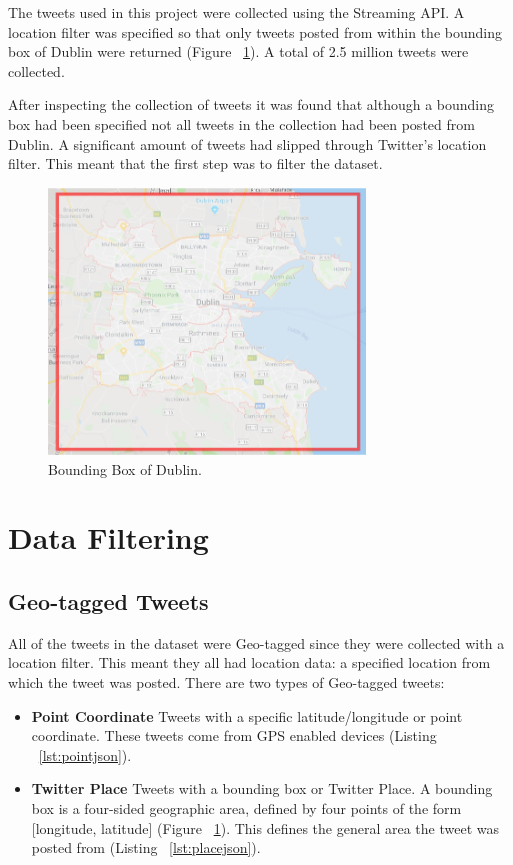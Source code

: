 The tweets used in this project were collected using the Streaming API. A location filter was specified so that only tweets posted from within the bounding box of Dublin were returned (Figure ~\ref{fig:dublinBB}). A total of 2.5 million tweets were collected.

After inspecting the collection of tweets it was found that although a bounding box had been specified not all tweets in the collection had been posted from Dublin. A significant amount of tweets had slipped through Twitter's location filter. This meant that the first step was to filter the dataset.

\begin{figure}[h!]
\centering
\includegraphics[width=0.75\textwidth]{design_and_methodology/dublinBB.png}
\caption{\label{fig:dublinBB} Bounding Box of Dublin.}
\end{figure}

\section{Data Filtering}

\subsection*{Geo-tagged Tweets}

All of the tweets in the dataset were Geo-tagged since they were collected with a location filter. This meant they all had location data: a specified location from which the tweet was posted. There are two types of Geo-tagged tweets:
\begin{itemize}
    \item \textbf{Point Coordinate}\newline
    Tweets with a specific latitude/longitude or point coordinate. These tweets come from GPS enabled devices (Listing ~\ref{lst:pointjson}).
    \item \textbf{Twitter Place}\newline
    Tweets with a bounding box or Twitter Place. A bounding box is a four-sided geographic area, defined by four points of the form [longitude, latitude] (Figure ~\ref{fig:dublinBB}). This defines the general area the tweet was posted from (Listing ~\ref{lst:placejson}). \newline
\end{itemize}

